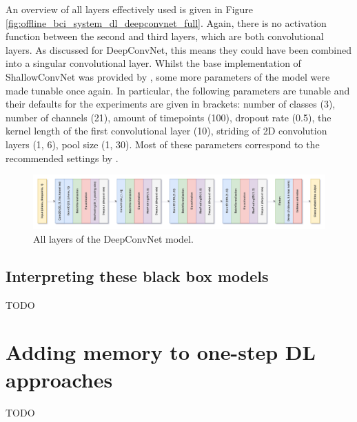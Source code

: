 An overview of all layers effectively used is given in Figure \ref{fig:offline_bci_system_dl_deepconvnet_full}.
Again, there is no activation function between the second and third layers, which are both convolutional layers.
As discussed for DeepConvNet, this means they could have been combined into a singular convolutional layer. 
Whilst the base implementation of ShallowConvNet was provided by \citet{arl_eegmodels}, some more parameters of the model were made tunable once again.
In particular, the following parameters are tunable and their defaults for the experiments are given in brackets: number of classes (3), number of channels (21), amount of timepoints (100), dropout rate (0.5), the kernel length of the first convolutional layer (10), striding of 2D convolution layers (1, 6), pool size (1, 30).
Most of these parameters correspond to the recommended settings by \citet{eeg_model_hbm}.

\begin{figure}[t]
    \centering
    \includegraphics[width=\linewidth]{../images/pipeline/deepconvnet_full.pdf}
    \captionsetup{width=0.8\linewidth}
    \captionsetup{justification=centering}
    \caption{All layers of the DeepConvNet model.}
    \label{fig:shallowconvnet_full}
\end{figure}


\subsection{Interpreting these black box models}
\label{subsec:offline_bci_system_one_step_dl_interpreting}

TODO

\section{Adding memory to one-step DL approaches}
\label{sec:offline_bci_system_adding_memory}

TODO


